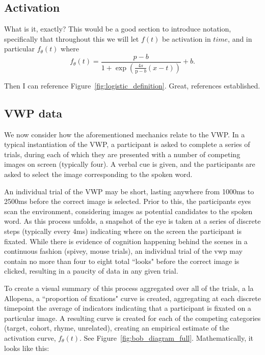 \documentclass{article}
\begin{document}
\subsection{Activation}

What is it, exactly? This would be a good section to introduce notation, specifically that throughout this we will let $f(t)$ be activation in $time$, and in particular $f_{\theta}(t)$ where
\begin{equation} \label{eq:logistic}
f_{\theta}(t) = \frac{p-b}{1 + \exp \left(\frac{4s}{\text{p}-b} (x - t) \right)} + b.
\end{equation}

Then I can reference Figure~\ref{fig:logistic_definition}. Great, references established.

\subsection{VWP data}


We now consider how the aforementioned mechanics relate to the VWP. In a typical instantiation of the VWP, a participant is asked to complete a series of trials, during each of which they are presented with a number of competing images on screen (typically four). A verbal cue is given, and the participants are asked to select the image corresponding to the spoken word.

An individual trial of the VWP may be short, lasting anywhere from 1000ms to 2500ms before the correct image is selected. Prior to this, the participants eyes scan the environment, considering images as potential candidates to the spoken word. As this process unfolds, a snapshot of the eye is taken at a series of discrete steps (typically every 4ms) indicating where on the screen the participant is fixated. While there is evidence of cognition happening behind the scenes in a continuous fashion (spivey, mouse trials), an individual trial of the vwp may contain no more than four to eight total ``looks" before the correct image is clicked, resulting in a paucity of data in any given trial.

To create a visual summary of this process aggregated over all of the trials, a la Allopena, a ``proportion of fixations" curve is created, aggregating at each discrete timepoint the average of indicators indicating that a participant is fixated on a particular image. A resulting curve is created for each of the competing categories (target, cohort, rhyme, unrelated), creating an empirical estimate of the activation curve, $f_{\theta}(t)$. See Figure~\ref{fig:bob_diagram_full}. Mathematically, it looks like this:
\end{document}
